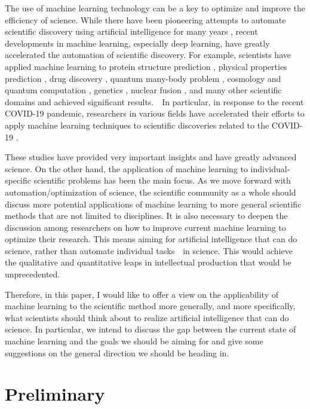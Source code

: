 \documentclass{article}
\begin{document}
The use of machine learning technology can be a key to optimize and improve the efficiency of science. While there have been pioneering attempts to automate scientific discovery using artificial intelligence for many years \cite{lindsay1993dendral,langley1987scientific,king2004functional}, recent developments in machine learning, especially deep learning, have greatly accelerated the automation of scientific discovery. For example, scientists have applied machine learning to protein structure prediction \cite{jumper2021highly,senior2020improved}, physical properties prediction \cite{ramprasad2017machine}, drug discovery \cite{vamathevan2019applications}, quantum many-body problem \cite{carleo2017solving}, cosmology and quantum computation \cite{carleo2019machine}, genetics \cite{libbrecht2015machine}, nuclear fusion \cite{degrave2022magnetic}, and many other scientific domains and achieved significant results.　In particular, in response to the recent COVID-19 pandemic, researchers in various fields have accelerated their efforts to apply machine learning techniques to scientific discoveries related to the COVID-19 \cite{shorten2021deep}.

These studies have provided very important insights and have greatly advanced science. On the other hand, the application of machine learning to individual-specific scientific problems has been the main focus. As we move forward with automation/optimization of science, the scientific community as a whole should discuss more potential applications of machine learning to more general scientific methods that are not limited to disciplines. It is also necessary to deepen the discussion among researchers on how to improve current machine learning to optimize their research. This means aiming for artificial intelligence that can do science, rather than automate individual tasks　in science. This would achieve the qualitative and quantitative leaps in intellectual production that would be unprecedented.　

Therefore, in this paper, I would like to offer a view on the applicability of machine learning to the scientific method more generally, and more specifically, what scientists should think about to realize artificial intelligence that can do science. In particular, we intend to discuss the gap between the current state of machine learning and the goals we should be aiming for and give some suggestions on the general direction we should be heading in.

\section{Preliminary}
\end{document}
